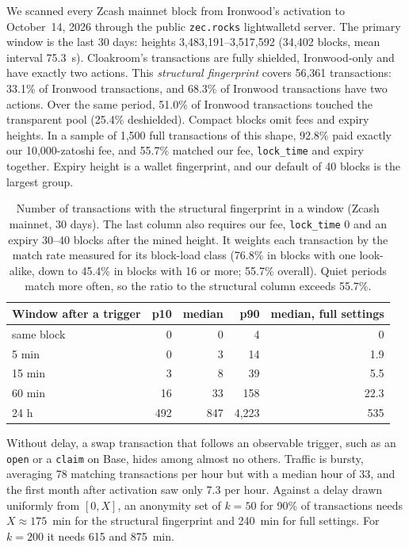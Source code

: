 \documentclass[10pt,letterpaper]{article}
\makeatletter
\renewcommand\subsection{\@startsection{subsection}{2}{\z@}{-0.9em}{0.25em}{\normalfont\normalsize\bfseries}}
\theoremstyle{plain}
\theoremstyle{definition}
\newcommand{\fn}[1]{\texttt{#1}}
\makeatother
\begin{document}
\subsection{Measured anonymity sets}
We scanned every Zcash mainnet block from Ironwood's activation to October~14, 2026 through the
public \fn{zec.rocks} lightwalletd server. The primary window is the last 30 days: heights
3{,}483{,}191--3{,}517{,}592 (34{,}402 blocks, mean interval 75.3~s). Cloakroom's transactions
are fully shielded, Ironwood-only and have exactly two actions. This \emph{structural fingerprint}
covers 56{,}361 transactions: 33.1\% of Ironwood transactions, and 68.3\% of Ironwood transactions
have two actions. Over the same period, 51.0\% of Ironwood transactions touched the transparent pool (25.4\%
deshielded). Compact blocks omit fees and expiry heights. In a sample of 1{,}500 full
transactions of this shape, 92.8\% paid exactly our 10{,}000-zatoshi fee, and 55.7\% matched our
fee, \texttt{lock\_time} and expiry together. Expiry height is a wallet fingerprint, and our default of 40 blocks is the
largest group.

\begin{table}[H]
\centering\small
\begin{tabular}{@{}lrrrr@{}}
\toprule
\textbf{Window after a trigger} & \textbf{p10} & \textbf{median} & \textbf{p90} & \textbf{median, full settings}\\
\midrule
same block & 0 & 0 & 4 & 0\\
5 min & 0 & 3 & 14 & 1.9\\
15 min & 3 & 8 & 39 & 5.5\\
60 min & 16 & 33 & 158 & 22.3\\
24 h & 492 & 847 & 4{,}223 & 535\\
\bottomrule
\end{tabular}
\caption{Number of transactions with the structural fingerprint in a window (Zcash mainnet, 30
days). The last column also requires our fee, \texttt{lock\_time} 0 and an expiry 30--40 blocks
after the mined height. It weights each transaction by the match rate measured for its
block-load class (76.8\% in blocks with one look-alike, down to 45.4\% in blocks with 16 or more;
55.7\% overall). Quiet periods match more often, so the ratio to the structural column exceeds
55.7\%.}
\end{table}

Without delay, a swap transaction that follows an observable trigger, such as an \fn{open} or a
\fn{claim} on Base, hides among almost no others. Traffic is bursty, averaging 78 matching
transactions per hour but with a median hour of 33, and the first month after activation saw
only 7.3 per hour. Against a delay drawn uniformly from $[0, X]$, an anonymity set of $k=50$ for
90\% of transactions needs $X \approx 175$~min for the structural fingerprint and 240~min for
full settings. For $k = 200$ it needs 615 and 875~min.
\end{document}
